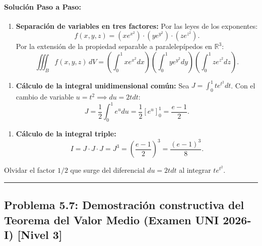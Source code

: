 \documentclass[11pt,a4paper]{article}
\begin{document}
\paragraph{Solución Paso a Paso:}\par
\begin{enumerate}[label=\textbf{\arabic*.}]
\item \textbf{Separación de variables en tres factores:}
Por las leyes de los exponentes:
\begin{equation*}
f(x,y,z) = (x e^{x^2}) \cdot (y e^{y^2}) \cdot (z e^{z^2}).
\end{equation*}
Por la extensión de la propiedad separable a paralelepípedos en $\mathbb{R}^3$:
\begin{equation*}
\iiint_B f(x,y,z) \, dV = \left( \int_0^1 x e^{x^2} dx \right) \left( \int_0^1 y e^{y^2} dy \right) \left( \int_0^1 z e^{z^2} dz \right).
\end{equation*}
\end{enumerate}

\begin{enumerate}[label=\textbf{\arabic*.}]
\item \textbf{Cálculo de la integral unidimensional común:}
Sea $J = \int_0^1 t e^{t^2} dt$. Con el cambio de variable $u = t^2 \implies du = 2t dt$:
\begin{equation*}
J = \frac{1}{2} \int_0^1 e^u du = \frac{1}{2} [e^u]_0^1 = \frac{e - 1}{2}.
\end{equation*}
\end{enumerate}

\begin{enumerate}[label=\textbf{\arabic*.}]
\item \textbf{Cálculo de la integral triple:}
\begin{equation*}
I = J \cdot J \cdot J = J^3 = \left(\frac{e - 1}{2}\right)^3 = \frac{(e - 1)^3}{8}.
\end{equation*}
\end{enumerate}

\begin{trapbox}
Olvidar el factor $1/2$ que surge del diferencial $du = 2t dt$ al integrar $t e^{t^2}$.
\end{trapbox}

\vspace{0.5cm}
\hrule
\vspace{0.5cm}

\subsection*{Problema 5.7: Demostración constructiva del Teorema del Valor Medio (Examen UNI 2026-I) \hfill \color{primaryblue}\small[Nivel 3]}
\end{document}
